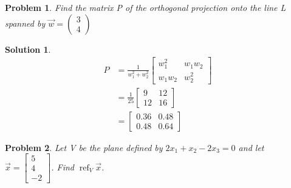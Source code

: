 \documentclass{article}
\newtheorem{problem}{Problem}
\newtheorem*{solution}{Solution}
\DeclareMathOperator{\refl}{ref}
\newcommand{\vectorrefl}[2][]{\refl_{#1}#2}
\begin{document}
\begin{problem}
Find the matrix P of the orthogonal projection onto the line L spanned by $\vec{w} = \begin{pmatrix} 3 \\ 4 \end{pmatrix}$
\end{problem}

\begin{solution}
\begin{align*}
P &= 
\displaystyle \frac{1}{w_{1}^2 + w_{2}^2} 
\begin{bmatrix}
w_{1}^2 & w_{1}w_{2} \\
w_{1}w_{2} & w_{2}^2
\end{bmatrix} \\
&=
\displaystyle \frac{1}{25} 
\begin{bmatrix}
9 & 12 \\
12 & 16
\end{bmatrix} \\
&= 
\begin{bmatrix}
0.36 & 0.48 \\
0.48 & 0.64
\end{bmatrix}
\end{align*}
\end{solution}

\begin{problem}
Let V be the plane defined by $2x_{1} + x_{2} - 2x_{3} = 0$ and let $\vec{x} = \begin{bmatrix}5 \\ 4 \\ -2 \end{bmatrix}$. Find $\vectorrefl[V]{\vec{x}}$.
\end{problem}
\end{document}
